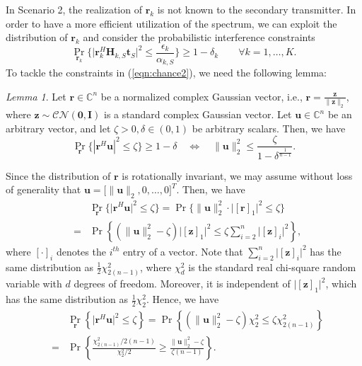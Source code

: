 \documentclass[twocolumn,10pt]{IEEEtran}
\theoremstyle{plain} \newtheorem{theorem}{Theorem}
\theoremstyle{plain} \newtheorem{proposition}{Proposition}
\theoremstyle{plain} \newtheorem{corollary}{Corollary}
\theoremstyle{remark} \newtheorem{remark}{Remark}
\theoremstyle{remark} \newtheorem{lemma}{Lemma}
\theoremstyle{plain} \newtheorem{definition}{Definition}
\theoremstyle{plain} \newtheorem{assumption}{Assumption}
\theoremstyle{plain} \newtheorem{fact}{Fact}
\begin{document}
In Scenario 2, the realization of $\mathbf{r}_k$ is not known to the secondary transmitter.  In order to have a more efficient utilization of the spectrum, we can exploit the distribution of $\mathbf{r}_k$ and consider the probabilistic interference constraints
\begin{equation}\label{eqn:chance2}
\Pr_{\mathbf{r}_k}\bigg\{\big| \mathbf{r}_k^H \mathbf{H}_{k,S}\mathbf{t}_S\big|^2 \leq \frac{\epsilon_k}{\alpha_{k,S}}\bigg\}\geq 1-\delta_k \qquad \forall k=1,\ldots,K.
\end{equation}
To tackle the constraints in (\ref{eqn:chance2}), we need the following lemma:
\begin{lemma}\label{lem:scn2-F}
   Let $\mathbf{r}\in\mathbb{C}^n$ be a normalized complex Gaussian vector, i.e., $\mathbf{r}=\frac{\mathbf{z}}{\|\mathbf{z}\|_2}$, where $\mathbf{z}\sim \mathcal{CN}(\mathbf{0}, \mathbf{I})$ is a standard complex Gaussian vector.  Let $\mathbf{u}\in\mathbb{C}^n$ be an arbitrary vector, and let $\zeta>0,\delta\in(0,1)$ be arbitrary scalars.  Then, we have
   $$ \Pr_{\mathbf{r}}\big\{| \mathbf{r}^H \mathbf{u}|^2 \leq \zeta\big\} \ge 1-\delta \quad\Longleftrightarrow\quad  \|\mathbf{u}\|_2^2\leq \frac{\zeta}{1-\delta^{\frac{1}{n-1}}}. $$
\end{lemma}
  Since the distribution of $\mathbf{r}$ is rotationally invariant, we may assume without loss of generality that $\mathbf{u}=\big[\|\mathbf{u}\|_2,0,\ldots,0\big]^T$. Then, we have
\begin{eqnarray}
&& \Pr_{\mathbf{r}}\big\{\big| \mathbf{r}^H \mathbf{u}\big|^2 \leq \zeta\big\} = \Pr\big\{\|\mathbf{u}\|_2^2\cdot\big|[\mathbf{r}]_1\big|^2 \leq \zeta\big\}\nonumber\\
  &=& \Pr\left\{(\|\mathbf{u}\|_2^2-\zeta)\big|[\mathbf{z}]_1\big|^2 \leq \zeta \sum_{i=2}^n\big|[\mathbf{z}]_i\big|^2 \right\},\nonumber
\end{eqnarray}
where $[\cdot]_i$ denotes the $i^{th}$ entry of a vector. Note that $\sum_{i=2}^n\big|[\mathbf{z}]_i\big|^2$ has the same distribution as $\frac{1}{2}\chi_{2(n-1)}^2$, where $\chi_d^2$ is the standard real chi-square random variable with $d$ degrees of freedom.  Moreover, it is independent of $\big|[\mathbf{z}]_1\big|^2$, which has the same distribution as $\frac{1}{2}\chi_2^2$.  Hence, we have
\begin{eqnarray*}
&&\Pr_{\mathbf{r}}\left\{\big| \mathbf{r}^H \mathbf{u}\big|^2 \leq \zeta\right\} = \Pr\left\{(\|\mathbf{u}\|_2^2-\zeta)\chi_2^2 \leq \zeta \chi_{2(n-1)}^2 \right\} \\
& =& \Pr\left\{ \frac{\chi_{2(n-1)}^2/2(n-1)}{\chi_2^2/2} \geq \frac{\|\mathbf{u}\|_2^2-\zeta}{\zeta(n-1)} \right\}. 
 \end{eqnarray*}
\end{document}

